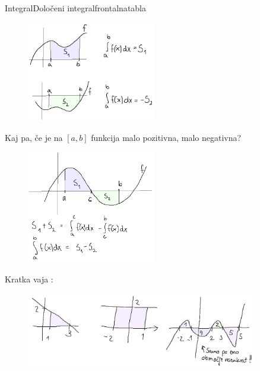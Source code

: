 \begin{priprava}{}{}{Integral}{Določeni integral}{frontalna}{tabla}

\begin{figure}[h]
    \centering
    \includegraphics[width=0.5\textwidth]{slike/ploscine.png}
\end{figure}

Kaj pa, če je na $ [a, b] $ funkcija malo pozitivna, malo negativna?

\newpage

\begin{figure}[h]
    \centering
    \includegraphics[width=0.5\textwidth]{slike/ploscine2.png}
\end{figure}


Kratka vaja :

\begin{figure}[h]
    \centering
    \includegraphics[width=0.9\textwidth]{slike/dol_vaje1.png}
\end{figure}


\end{priprava}
